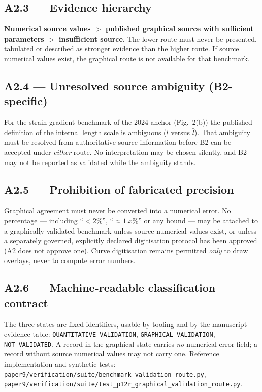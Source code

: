 \documentclass[11pt,a4paper]{article}
\begin{document}
\subsection*{A2.3 --- Evidence hierarchy}
\textbf{Numerical source values $>$ published graphical source with sufficient parameters $>$
insufficient source.} The lower route must never be presented, tabulated or described as stronger
evidence than the higher route. If source numerical values exist, the graphical route is not available
for that benchmark.

\subsection*{A2.4 --- Unresolved source ambiguity (B2-specific)}
For the strain-gradient benchmark of the 2024 anchor (Fig.~2(b)) the published definition of the
internal length scale is ambiguous ($l$ versus $\bar l$). That ambiguity must be resolved from
authoritative source information before B2 can be accepted under \emph{either} route. No interpretation
may be chosen silently, and B2 may not be reported as validated while the ambiguity stands.

\subsection*{A2.5 --- Prohibition of fabricated precision}
Graphical agreement must never be converted into a numerical error. No percentage --- including
``$<2\%$'', ``$\approx1.x\%$'' or any bound --- may be attached to a graphically validated benchmark
unless source numerical values exist, or unless a separately governed, explicitly declared digitisation
protocol has been approved (A2 does not approve one). Curve digitisation remains permitted \emph{only}
to draw overlays, never to compute error numbers.

\subsection*{A2.6 --- Machine-readable classification contract}
The three states are fixed identifiers, usable by tooling and by the manuscript evidence table:
\texttt{QUANTITATIVE\_VALIDATION}, \texttt{GRAPHICAL\_VALIDATION}, \texttt{NOT\_VALIDATED}. A record in
the graphical state carries \emph{no} numerical error field; a record without source numerical values may
not carry one. Reference implementation and synthetic tests:
\texttt{paper9/verification/suite/benchmark\_validation\_route.py},
\texttt{paper9/verification/suite/test\_p12r\_graphical\_validation\_route.py}.
\end{document}

